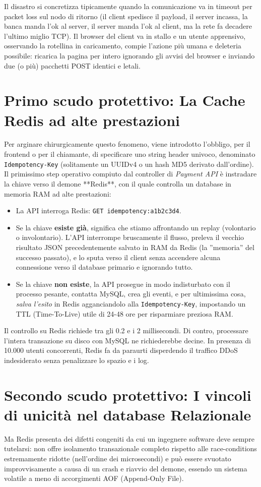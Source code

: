 \documentclass[11pt,a4paper]{report}
\begin{document}
Il disastro si concretizza tipicamente quando la comunicazione va in timeout per packet loss sul nodo di ritorno (il client spedisce il payload, il server incassa, la banca manda l'ok al server, il server manda l'ok al client, ma la rete fa decadere l'ultimo miglio TCP). Il browser del client va in stallo e un utente apprensivo, osservando la rotellina in caricamento, compie l'azione pi\`u umana e deleteria possibile: ricarica la pagina per intero ignorando gli avvisi del browser e inviando due (o pi\`u) pacchetti POST identici e letali.

\section{Primo scudo protettivo: La Cache Redis ad alte prestazioni}
Per arginare chirurgicamente questo fenomeno, viene introdotto l'obbligo, per il frontend o per il chiamante, di specificare uno string header univoco, denominato \texttt{Idempotency-Key} (solitamente un UUIDv4 o un hash MD5 derivato dall'ordine).
Il primissimo step operativo compiuto dal controller di \textit{Payment API} \`e instradare la chiave verso il demone **Redis**, con il quale controlla un database in memoria RAM ad alte prestazioni:
\begin{itemize}
    \item La API interroga Redis: \texttt{GET idempotency:a1b2c3d4}.
    \item Se la chiave \textbf{esiste gi\`a}, significa che stiamo affrontando un replay (volontario o involontario). L'API interrompe bruscamente il flusso, preleva il vecchio risultato JSON precedentemente salvato in RAM da Redis (la ''memoria'' del successo passato), e lo sputa verso il client senza accendere alcuna connessione verso il database primario e ignorando tutto.
    \item Se la chiave \textbf{non esiste}, la API prosegue in modo indisturbato con il processo pesante, contatta MySQL, crea gli eventi, e per ultimissima cosa, \textit{salva l'esito} in Redis agganciandolo alla \texttt{Idempotency-Key}, impostando un TTL (Time-To-Live) utile di 24-48 ore per risparmiare preziosa RAM.
\end{itemize}
Il controllo su Redis richiede tra gli 0.2 e i 2 millisecondi. Di contro, processare l'intera transazione su disco con MySQL ne richiederebbe decine. In presenza di 10.000 utenti concorrenti, Redis fa da paraurti disperdendo il traffico DDoS indesiderato senza penalizzare lo spazio e i log.

\section{Secondo scudo protettivo: I vincoli di unicit\`a nel database Relazionale}
Ma Redis presenta dei difetti congeniti da cui un ingegnere software deve sempre tutelarsi: non offre isolamento transazionale completo rispetto alle race-conditions estremamente ridotte (nell'ordine dei microsecondi) e pu\`o essere svuotato improvvisamente a causa di un crash e riavvio del demone, essendo un sistema volatile a meno di accorgimenti AOF (Append-Only File).
\end{document}
